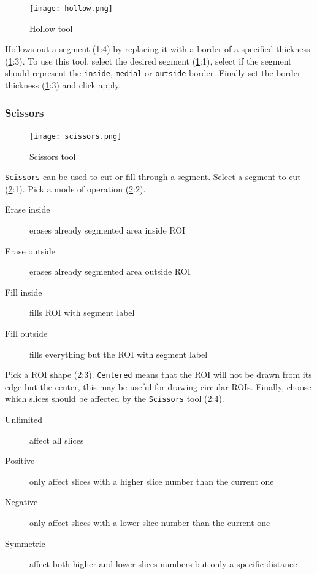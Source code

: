 \begin{figure}[h!]
	\centerline{
		\texttt{[image: hollow.png]}}
	\caption{Hollow tool}\label{fig:hollow}
\end{figure}
\noindent
Hollows out a segment (\cref{fig:hollow}:4) by replacing it with a border of a specified thickness (\cref{fig:hollow}:3).
To use this tool, select the desired segment (\cref{fig:hollow}:1), select if the segment should represent the \texttt{inside}, \texttt{medial} or \texttt{outside} border.
Finally set the border thickness (\cref{fig:hollow}:3) and click apply.

\pagebreak
\subsubsection{Scissors}\label{section:scissors}
\begin{figure}[h]
	\begin{subfigure}{0.2\textwidth}
		
	\end{subfigure}
\end{figure}

\begin{figure}[h!]
	\centerline{
		\texttt{[image: scissors.png]}}
	\caption{Scissors tool}\label{fig:scissors}
\end{figure}
\noindent
\texttt{Scissors} can be used to cut or fill through a segment.
Select a segment to cut (\cref{fig:scissors}:1).
Pick a mode of operation (\cref{fig:scissors}:2).
\begin{description}
	\item [Erase inside] erases already segmented area inside ROI
	\item [Erase outside] erases already segmented area outside ROI
	\item [Fill inside] fills ROI with segment label
	\item [Fill outside] fills everything but the ROI with segment label
\end{description}
Pick a ROI shape (\cref{fig:scissors}:3). \texttt{Centered} means that the ROI will not be drawn from its edge but the center, this may be useful for drawing circular ROIs.
Finally, choose which slices should be affected by the \texttt{Scissors} tool (\cref{fig:scissors}:4).
\begin{description}
	\item [Unlimited] affect all slices
	\item [Positive] only affect slices with a higher slice number than the current one
	\item [Negative] only affect slices with a lower slice number than the current one
	\item [Symmetric] affect both higher and lower slices numbers but only a specific distance
\end{description}

